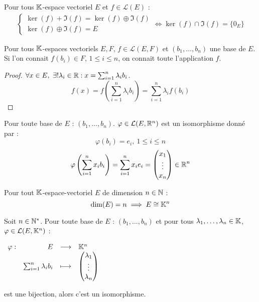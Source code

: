 \begin{corollary}
    Pour tous $\mathbb{K}$-espace vectoriel $E$ et $f \in \mathcal{L}(E)$ :
    \begin{align*}
        \begin{cases}
            \ker(f) + \Im(f) = \ker(f) \oplus \Im(f) \\
            \ker(f) \oplus \Im(f) = E
        \end{cases}
        \iff 
        \ker(f) \cap \Im(f) = \{0_E\}
    \end{align*}
\end{corollary}

\begin{proposition}
    Pour tous $\mathbb{K}$-espaces vectoriels $E, F$, $f \in \mathcal{L}(E, F)$ et $(b_1, \ldots, b_n)$ une base de $E$. Si l'on connait $f(b_i) \in F$, $1 \leq i \leq n$, on connait toute l'application $f$.
\end{proposition}

\begin{proof}
	$\forall x \in E,\ \exists ! \lambda_i \in \mathbb{R} : x = \sum_{i=1}^{n} \lambda_i b_i$.
	\[ f(x) = f \left( \sum_{i=1}^{n} \lambda_i b_i \right) = \sum_{i=1}^{n} \lambda_i f(b_i) \]
\end{proof}

\begin{corollary}
    Pour toute base de $E$ : $(b_1, \ldots, b_n)$. $\varphi \in \mathcal{L}(E, \mathbb{R}^n)$ est un isomorphisme donné par :
    \[ \varphi(b_i) = e_i,\ 1 \leq i \leq n \]
    \[ \varphi \left( \sum_{i = 1}^{n} x_i b_i \right) = \sum_{i = 1}^{n} x_i e_i = 
    \begin{pmatrix}
        x_1 \\
        \vdots \\
        x_n
    \end{pmatrix}
    \in \mathbb{R}^n
     \]
\end{corollary}

\begin{lemma} Pour tout $\mathbb{K}$-espace-vectoriel $E$ de dimension $n \in \mathbb{N}$ :
    \[ \dim(E) = n \implies E \cong \mathbb{K}^n \]
\end{lemma}

\begin{lemma}
    Soit $n \in \mathbb{N}^*$. Pour toute base de $E$ : $(b_1, \ldots, b_n)$ et pour tous $\lambda_1, \ldots, \lambda_n \in \mathbb{K}$, $\varphi \in \mathcal{L}(E, \mathbb{K}^n)$ :
    \begin{center}
    	$
    	\begin{array}{rrcl} \varphi : & E & \longrightarrow & \mathbb{K}^n \\ & \sum_{i = 1}^{n} \lambda_i b_i & \longmapsto & 
    	\begin{pmatrix}
    		\lambda_1 \\
    		\vdots \\
    		\lambda_n
    	\end{pmatrix}
    	 \end{array}
    	$
    \end{center}
    est une bijection, alors c'est un isomorphisme.
\end{lemma}

